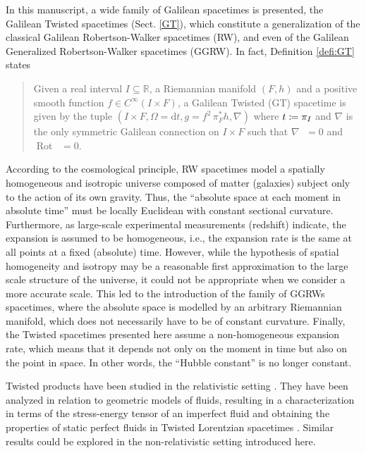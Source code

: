 \documentclass[12pt]{article}
\newcommand{\diff}{\mathrm{d}}
\newcommand{\dt}{\diff t}
\newcommand{\coloneq}{\vcentcolon\mathrel{\mkern -1.2mu}\mathrel{=}}
\DeclareMathOperator{\pt}{\partial_t}
\DeclareMathOperator{\rot}{Rot}
\def\R{\mathbb R}
\begin{document}
In this manuscript, a wide family of Galilean spacetimes is presented, the Galilean Twisted spacetimes (Sect. \ref{GT}), which constitute a generalization of the classical Galilean Robertson-Walker spacetimes (RW), and even of the Galilean Generalized Robertson-Walker spacetimes (GGRW). In fact, Definition \ref{defi:GT} states 
\begin{quote}
\upshape
Given a real interval $I\subseteq\R$, a Riemannian manifold $(F,h)$ and a positive smooth function $f\in C^\infty(I\times F)$, a Galilean Twisted (GT) spacetime is given by the tuple $(I\times F, \Omega=\dt, g=f^2 \, \pi_F^* h, \nabla)$ where $t\coloneq \pi_I$ and $\nabla$ is the only symmetric Galilean connection on $I\times F$ such that $\nabla_{\pt} \pt = 0$ and $\rot \pt = 0$.
\end{quote}
According to the cosmological principle, RW spacetimes model a spatially homogeneous and isotropic universe composed of matter (galaxies) subject only to the action of its own gravity. Thus, the ``absolute space at each moment in absolute time'' must be locally Euclidean with constant sectional curvature. Furthermore, as large-scale experimental measurements (redshift) indicate, the expansion is assumed to be homogeneous, i.e., the expansion rate is the same at all points at a fixed (absolute) time.  
However, while the hypothesis of spatial homogeneity and isotropy may be a reasonable first approximation to the large scale structure of the universe, it could not be appropriate when we consider a more accurate scale. This led to the introduction of the family of GGRWs spacetimes, where the absolute space is modelled by an arbitrary Riemannian manifold, which does not necessarily have to be of constant curvature. Finally, the Twisted spacetimes presented here assume a non-homogeneous expansion rate, which means that it depends not only on the moment in time but also on the point in space. In other words, the ``Hubble constant'' is no longer constant.

Twisted products have been studied in the relativistic setting \cite{Chen1979, Chen2017-warped, ManticaMolinari2017-survey, Soria2023}. They have been analyzed in relation to geometric models of fluids, resulting in a characterization in terms of the stress-energy tensor of an imperfect fluid \cite{ManticaMolinari2017-torseforming} and obtaining the properties of static perfect fluids in Twisted Lorentzian spacetimes \cite{Guler2023}. Similar results could be explored in the non-relativistic setting introduced here. 
\end{document}
